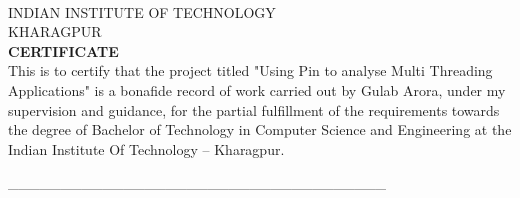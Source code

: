 \newpage
\begin{center}
 \\[1cm]
\textsc{\large INDIAN INSTITUTE OF TECHNOLOGY} \\[0.3cm]
\textsc{\large KHARAGPUR} \\[1cm]
\textsc{\Large \textbf{CERTIFICATE}} \\[0.5cm]
This is to certify that the project titled "Using Pin to analyse Multi Threading Applications" is a bonafide
record of work carried out by Gulab
Arora, under my supervision and guidance, for the partial fulfillment of the requirements towards the degree of Bachelor of Technology in Computer Science and Engineering at the Indian Institute Of Technology
– Kharagpur.
\\[3.5cm]
\begin{flushright} \large
\_\_\_\_\_\_\_\_\_\_\_\_\_\_\_\_\_\_\_\_\_\_\_\_\_\_\_\_\_\_\_\_\_\_\_\_
\end{flushright}
\vfill
\end{center}